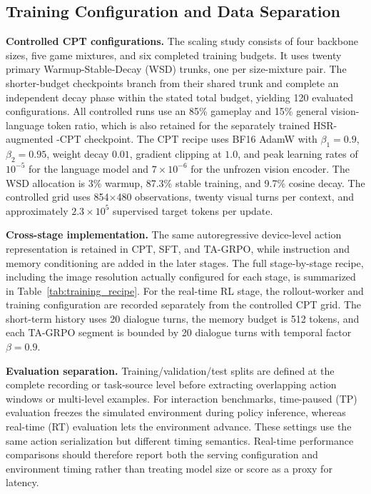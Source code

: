 \subsection{Training Configuration and Data Separation}

\textbf{Controlled CPT configurations.} The scaling study consists of four backbone sizes, five game mixtures, and six completed training budgets. It uses twenty primary Warmup-Stable-Decay (WSD) trunks, one per size-mixture pair. The shorter-budget checkpoints branch from their shared trunk and complete an independent decay phase within the stated total budget, yielding 120 evaluated configurations. All controlled runs use an 85\% gameplay and 15\% general vision-language token ratio, which is also retained for the separately trained HSR-augmented \ourmodel-CPT checkpoint. The CPT recipe uses BF16 AdamW with $\beta_1=0.9$, $\beta_2=0.95$, weight decay $0.01$, gradient clipping at $1.0$, and peak learning rates of $10^{-5}$ for the language model and $7\times10^{-6}$ for the unfrozen vision encoder. The WSD allocation is 3\% warmup, 87.3\% stable training, and 9.7\% cosine decay. The controlled grid uses 854$\times$480 observations, twenty visual turns per context, and approximately $2.3\times10^{5}$ supervised target tokens per update.

\textbf{Cross-stage implementation.} The same autoregressive device-level action representation is retained in CPT, SFT, and TA-GRPO, while instruction and memory conditioning are added in the later stages. The full stage-by-stage recipe, including the image resolution actually configured for each stage, is summarized in Table~\ref{tab:training_recipe}. For the real-time RL stage, the rollout-worker and training configuration are recorded separately from the controlled CPT grid. The short-term history uses 20 dialogue turns, the memory budget is 512 tokens, and each TA-GRPO segment is bounded by 20 dialogue turns with temporal factor $\beta=0.9$.

\textbf{Evaluation separation.} Training/validation/test splits are defined at the complete recording or task-source level before extracting overlapping action windows or multi-level examples. For interaction benchmarks, time-paused (TP) evaluation freezes the simulated environment during policy inference, whereas real-time (RT) evaluation lets the environment advance. These settings use the same action serialization but different timing semantics. Real-time performance comparisons should therefore report both the serving configuration and environment timing rather than treating model size or score as a proxy for latency.

